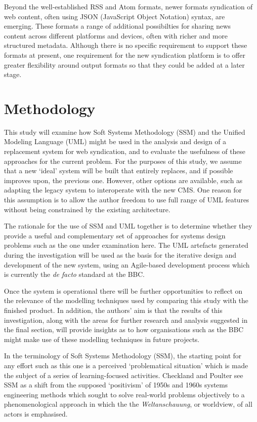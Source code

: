 \documentclass[runningheads,a4paper]{llncs}
\begin{document}
Beyond the well-established RSS and Atom formats, newer formats syndication of web content, often using JSON (JavaScript Object Notation) syntax, are emerging. These formats a range of additional possibilties for sharing news content across different platforms and devices, often with richer and more structured metadata. Although there is no specific requirement to support these formats at present, one requirement for the new syndication platform is to offer greater flexibility around output formats so that they could be added at a later stage.


\section{Methodology}

This study will examine how Soft Systems Methodology (SSM) and the Unified Modeling Language (UML) might be used in the analysis and design of a replacement system for web syndication, and to evaluate the usefulness of these approaches for the current problem. For the purposes of this study, we assume that a new `ideal' system will be built that entirely replaces, and if possible improves upon, the previous one. However, other options are available, such as adapting the legacy system to interoperate with the new CMS. One reason for this assumption is to allow the author freedom to use full range of UML features without being constrained by the existing architecture.

The rationale for the use of SSM and UML together is to determine whether they provide a useful and complementary set of approaches for systems design problems such as the one under examination here. The UML artefacts generated during the investigation will be used as the basis for the iterative design and development of the new system, using an Agile-based development process which is currently the \textit{de facto} standard at the BBC.

Once the system is operational there will be further opportunities to reflect on the relevance of the modelling techniques used by comparing this study with the finished product. In addition, the authors' aim is that the results of this investigation, along with the areas for further research and analysis suggested in the final section, will provide insights as to how organisations such as the BBC might make use of these modelling techniques in future projects.

In the terminology of Soft Systems Methodology (SSM), the starting point for any effort such as this one is a perceived `problematical situation' which is made the subject of a series of learning-focused activities. Checkland and Poulter \cite{checkland2006} see SSM as a shift from the supposed `positivism' of 1950s and 1960s systems engineering methods which sought to solve real-world problems objectively to a phenomenological approach in which the the \textit{Weltanschauung}, or worldview, of all actors is emphasised.
\end{document}
